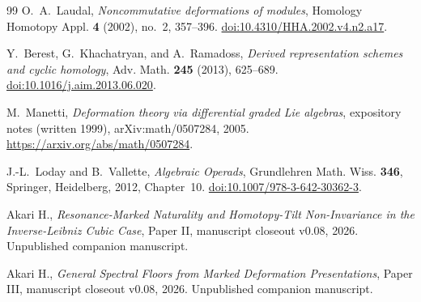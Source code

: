 \documentclass[11pt]{amsart}
\begin{document}
\begin{thebibliography}{99}
O.~A.~Laudal,
\emph{Noncommutative deformations of modules},
Homology Homotopy Appl. \textbf{4} (2002), no.~2, 357--396.
\href{https://doi.org/10.4310/HHA.2002.v4.n2.a17}{doi:10.4310/HHA.2002.v4.n2.a17}.

Y.~Berest, G.~Khachatryan, and A.~Ramadoss,
\emph{Derived representation schemes and cyclic homology},
Adv. Math. \textbf{245} (2013), 625--689.
\href{https://doi.org/10.1016/j.aim.2013.06.020}{doi:10.1016/j.aim.2013.06.020}.


M.~Manetti,
\emph{Deformation theory via differential graded Lie algebras},
expository notes (written 1999), arXiv:math/0507284, 2005.
\url{https://arxiv.org/abs/math/0507284}.

J.-L.~Loday and B.~Vallette,
\emph{Algebraic Operads}, Grundlehren Math. Wiss. \textbf{346},
Springer, Heidelberg, 2012, Chapter~10.
\href{https://doi.org/10.1007/978-3-642-30362-3}{doi:10.1007/978-3-642-30362-3}.

Akari H.,
\emph{Resonance-Marked Naturality and Homotopy-Tilt Non-Invariance in the Inverse-Leibniz Cubic Case},
Paper II, manuscript closeout v0.08, 2026. Unpublished companion manuscript.

Akari H.,
\emph{General Spectral Floors from Marked Deformation Presentations},
Paper III, manuscript closeout v0.08, 2026. Unpublished companion manuscript.
\end{thebibliography}
\end{document}
